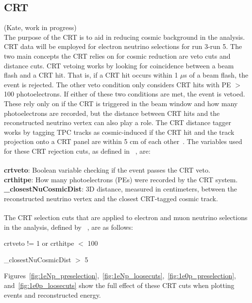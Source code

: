 \subsection{CRT} %
(Kate, work in progress)\\
The purpose of the CRT is to aid in reducing cosmic background in the analysis. CRT data will be employed for electron neutrino selections for run 3-run 5. The two main concepts the CRT relies on for cosmic reduction are veto cuts and distance cuts. CRT vetoing works by looking for coincidence between a beam flash and a CRT hit. That is, if a CRT hit occurs within 1 $\mu$s of a beam flash, the event is rejected. The other veto condition only considers CRT hits with PE \(>\) 100 photoelectrons. If either of these two conditions are met, the event is vetoed. These rely only on if the CRT is triggered in the beam window and how many photoelectrons are recorded, but the distance between CRT hits and the reconstructed neutrino vertex can also play a role. The CRT distance tagger works by tagging TPC tracks as cosmic-induced if the CRT hit and the track projection onto a CRT panel are within 5 cm of each other~\cite{PELEEnote}. The variables used for these CRT rejection cuts, as defined in ~\cite{PELEEnote}, are:\\
\\
\textbf{crtveto}: Boolean variable checking if the event passes the CRT veto.\\
\textbf{crthitpe}: How many photoelectrons (PEs) were recorded by the CRT system.\\
\textbf{\_closestNuCosmicDist}: 3D distance, measured in centimeters, between the reconstructed neutrino vertex and the closest CRT-tagged cosmic track.\\
\\
The CRT selection cuts that are applied to electron and muon neutrino selections in the analysis, defined by ~\cite{PELEEnote}, are as follows:

\begin{center}
    crtveto != 1  or crthitpe \(<\) 100 
\end{center}
\begin{center}
    \_closestNuCosmicDist \(>\) 5
\end{center}

Figures~\ref{fig:1eNp_preselection},~\ref{fig:1eNp_loosecuts},~\ref{fig:1e0p_preselection}, and~\ref{fig:1e0p_loosecuts} show the full effect of these CRT cuts when plotting events and reconstructed energy.

